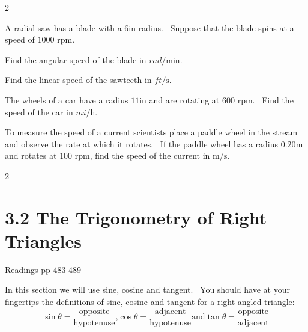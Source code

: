 \begin{description}
\begin {multicols}{2}
\item
\setlength\fboxrule{0in}\setlength\fboxsep{0.2in}
\end {multicols}
  

\item [65.] A radial saw has a blade with a $6 \mbox{in}$ radius. \ Suppose that the blade spins at a speed
of $1000$ rpm. 

\item [(a)] Find the angular
speed of the blade in $rad/\mbox{min}\text{.}$ 

\item [(b)] Find the linear
speed of the sawteeth in $ft/\mbox{s}$. 

\item [67.] The wheels of a car have
a radius $11 \mbox{in}$ and are rotating at $600$ rpm. \ Find the speed of the car in $mi/\mbox{h}$. 

\item [69.] To measure the speed of
a current scientists place a paddle wheel in the stream and observe the rate at which it rotates. \ If the paddle
wheel has a radius $0.20 \mbox{m}$ and rotates at $100$ rpm, find the speed of the current in $\mathrm{m}/\mbox{s}$. \end{description}


\columnsep =30pt
\begin {multicols}{2}
 


\end {multicols}
 

\section{3.2 The Trigonometry of Right Triangles}
Readings pp 483-489 

In this section we will use sine, cosine and tangent. \ You
should have at your fingertips the definitions of sine, cosine and tangent for a right angled triangle:
\begin{equation*}\sin  \theta  =\frac{\text{opposite}}{\text{hypotenuse}}\text{,}\cos  \theta  =\frac{\text{adjacent}}{\text{hypotenuse}}\text{and}\tan  \theta  =\frac{\text{opposite}}{\text{adjacent}}
\end{equation*}


